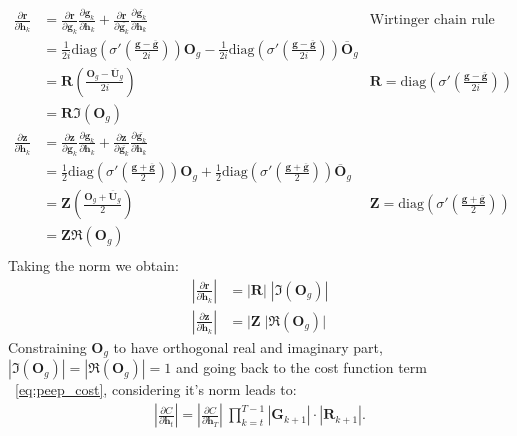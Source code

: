 \documentclass{article}
\begin{document}
\begin{align}
\frac{\partial \mathbf{r}}{\partial \mathbf{h}_k} &= \frac{\partial \mathbf{r}}{\partial \mathbf{g}_k}\frac{\partial \mathbf{g}_k}{\partial \mathbf{h}_k} + \frac{\partial \mathbf{r}}{\partial \overline{\mathbf{g}_k}}\frac{\partial \overline{\mathbf{g}_k}}{\partial \mathbf{h}_k}  & \text{Wirtinger chain rule}\\
                                &= \frac{1}{2i}\text{diag}(\sigma'(\frac{\mathbf{g} - \overline{\mathbf{g}}}{2i}))\mathbf{O}_g - \frac{1}{2i}\text{diag}(\sigma'(\frac{\mathbf{g} - \overline{\mathbf{g}}}{2i}))\overline{\mathbf{O}}_g \\
                                &= \mathbf{R}(\frac{\mathbf{O}_g - \overline{\mathbf{U}}_g}{2i})  & \mathbf{R} = \text{diag}(\sigma'(\frac{\mathbf{g} - \overline{\mathbf{g}}}{2i}))\\
                                &= \mathbf{R}\Im(\mathbf{O}_g) \\
\frac{\partial \mathbf{z}}{\partial \mathbf{h}_k} &= \frac{\partial \mathbf{z}}{\partial \mathbf{g}_k}\frac{\partial \mathbf{g}_k}{\partial \mathbf{h}_k} + \frac{\partial \mathbf{z}}{\partial \overline{\mathbf{g}_k}}\frac{\partial \overline{\mathbf{g}_k}}{\partial \mathbf{h}_k}  & \\
                                &= \frac{1}{2}\text{diag}(\sigma'(\frac{\mathbf{g} + \overline{\mathbf{g}}}{2}))\mathbf{O}_g +   \frac{1}{2}\text{diag}(\sigma'(\frac{\mathbf{g} + \overline{\mathbf{g}}}{2}))\overline{\mathbf{O}}_g \\
                                &= \mathbf{Z}(\frac{\mathbf{O}_g + \overline{\mathbf{U}}_g}{2}) & \mathbf{Z} = \text{diag}(\sigma'(\frac{\mathbf{g} + \overline{\mathbf{g}}}{2})) \\
                                &= \mathbf{Z}\Re(\mathbf{O}_g) \\
\end{align}
Taking the norm we obtain:
\begin{align}
|\frac{\partial \mathbf{r}}{\partial \mathbf{h}_k}| &= | \mathbf{R}| \; |\Im(\mathbf{O}_g)| \\
|\frac{\partial \mathbf{z}}{\partial \mathbf{h}_k}| &= | \mathbf{Z} \; |\Re(\mathbf{O}_g)|
\end{align}
Constraining $\mathbf{O}_g$ to have orthogonal real and imaginary part, $|\Im(\mathbf{O}_g)| = |\Re(\mathbf{O}_g)| = 1$ and going back to the cost function term ~\ref{eq:peep_cost}, considering it's norm leads to:
\begin{align}
|\frac{\partial C}{\partial \mathbf{h}_t}| = |\frac{\partial C}{\partial \mathbf{h}_T}| \:  \prod_{k=t}^{T-1} 
                                  |\mathbf{G}_{k+1}| \cdot |\mathbf{R}_{k+1}|.
\end{align}
\end{document}
